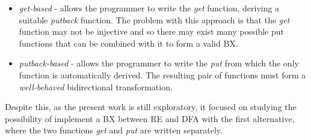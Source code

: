 \begin{itemize}
    \item \textit{get-based} - allows the programmer to write the \textit{get} function, deriving a suitable \textit{putback} function. The problem with this approach is that the \textit{get} function may not be injective and so there may exist many possible put functions that can be combined with it to form a valid BX.
    
    \item \textit{putback-based} - allows the programmer to write the \textit{put} from which the only  function is automatically  derived. The resulting pair of functions must form a \textit{well-behaved} bidirectional transformation.
\end{itemize}

Despite this, as the present work is still exploratory, it focused on studying the possibility of implement a BX between RE and DFA with the first alternative, where the two functions \textit{get} and \textit{put} are written separately. 